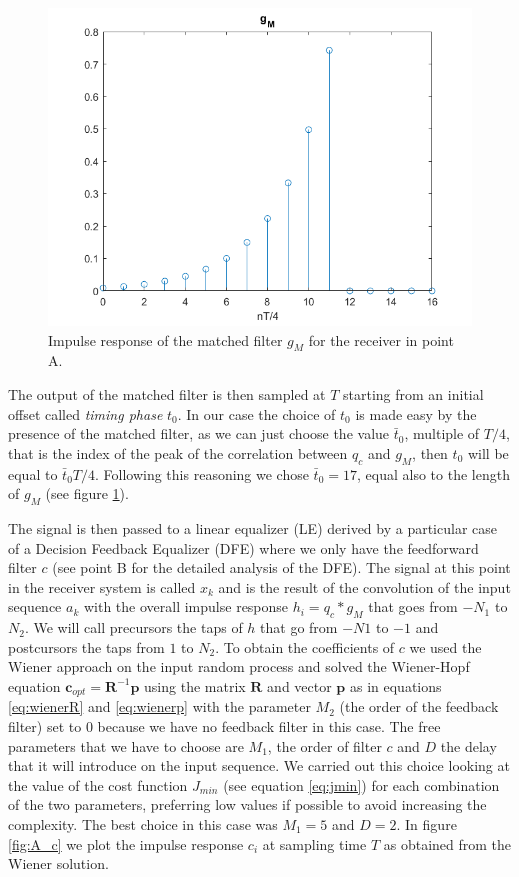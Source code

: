 \documentclass[a4paper,11.5pt]{article}
\newcommand{\vt}{\boldsymbol}
\begin{document}
\begin{figure}[ht]
	\begin{center}   
		\includegraphics[width=\textwidth]{figs/A_gm.png} 
		\caption{Impulse response of the matched filter $g_{M}$ for the receiver in point A.}
		\label{fig:A_gm}
	\end{center}
\end{figure} 

The output of the matched filter is then sampled at $T$ starting from an initial offset called \emph{timing phase} $t_0$. In our case the choice of $t_0$ is made easy by the presence of the matched filter, as we can just choose the value $\bar{t}_0$, multiple of $T/4$, that is the index of the peak of the correlation between $q_c$ and $g_M$, then $t_0$ will be equal to $\bar{t}_0 T/4$. Following this reasoning we chose $\bar{t}_0=17$, equal also to the length of $g_M$ (see figure \ref{fig:A_gm}).

The signal is then passed to a linear equalizer (LE) derived by a particular case of a Decision Feedback Equalizer (DFE) where we only have the feedforward filter $c$ (see point B for the detailed analysis of the DFE). The signal at this point in the receiver system is called $x_k$ and is the result of the convolution of the input sequence $a_k$ with the overall impulse response $h_i = q_c * g_M$ that goes from $-N_1$ to $N_2$. We will call precursors the taps of $h$ that go from $-N1$ to $-1$ and postcursors the taps from $1$ to $N_2$. To obtain the coefficients of $c$ we used the Wiener approach on the input random process and solved the Wiener-Hopf equation $\vt{c}_{opt}=\vt{R}^{-1}\vt{p}$ using the matrix $\vt{R}$ and vector $\vt{p}$ as in equations \ref{eq:wienerR} and \ref{eq:wienerp} with the parameter $M_2$ (the order of the feedback filter) set to $0$ because we have no feedback filter in this case. The free parameters that we have to choose are $M_1$, the order of filter $c$ and $D$ the delay that it will introduce on the input sequence. We carried out this choice looking at the value of the cost function $J_{min}$ (see equation \ref{eq:jmin}) for each combination of the two parameters, preferring low values if possible to avoid increasing the complexity. The best choice in this case was $M_1=5$ and $D=2$.
In figure \ref{fig:A_c} we plot the impulse response $c_i$ at sampling time $T$ as obtained from the Wiener solution. 
\end{document}
